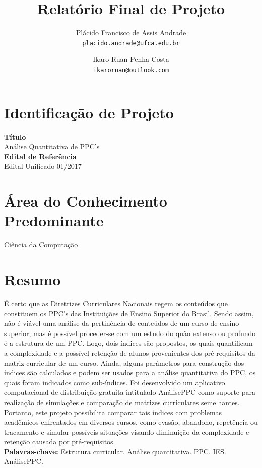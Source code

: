 \documentclass[a4paper, 12pt]{article}
\title{Relatório Final de Projeto}
\author{Plácido Francisco de Assis Andrade\\ 
	\texttt{placido.andrade@ufca.edu.br} 
	\and 
	Ikaro Ruan Penha Costa \\
	\texttt{ikaroruan@outlook.com}
	}
\date{}
\begin{document}
\maketitle


\section*{Identificação de Projeto}
\textbf{Título} \\
Análise Quantitativa de PPC's \\

\noindent \textbf{Edital de Referência} \\
Edital Unificado 01/2017 \\

\section*{Área do Conhecimento Predominante}
Ciência da Computação

\onehalfspace
\section*{Resumo}

É certo que as Diretrizes Curriculares Nacionais regem os conteúdos que constituem os PPC's das Instituições de Ensino Superior do Brasil. Sendo assim, não 
é viável uma análise da pertinência de conteúdos de um curso de ensino superior, mas é possível proceder-se com um estudo do quão extenso ou profundo é a 
estrutura de um PPC. Logo, dois índices são propostos, os quais quantificam a complexidade e a possível retenção de alunos provenientes dos pré-requisitos da 
matriz curricular de um curso. Ainda, alguns parâmetros para construção dos índices são calculados e podem ser usados para a análise quantitativa do PPC, os quais 
foram indicados como sub-índices. Foi desenvolvido um aplicativo computacional de distribuição gratuita intitulado AnálisePPC como suporte para realização de 
simulações e comparação de matrizes curriculares semelhantes. Portanto, este projeto possibilita comparar tais índices com problemas acadêmicos enfrentados em diversos 
cursos, como evasão, abandono, repetência ou tracamento e simular possíveis situações visando diminuição da complexidade e retenção causada por pré-requisitos. \\

\textbf{Palavras-chave:} Estrutura curricular. Análise quantitativa. PPC. IES. AnálisePPC.
\end{document}
